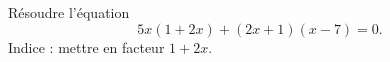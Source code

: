 
\begin{exercice}\label{exosmath-0340}

    Résoudre l'équation
    \begin{equation}
        5x(1+2x)+(2x+1)(x-7)=0.
    \end{equation}
    Indice : mettre en facteur \( 1+2x\).

\end{exercice}
